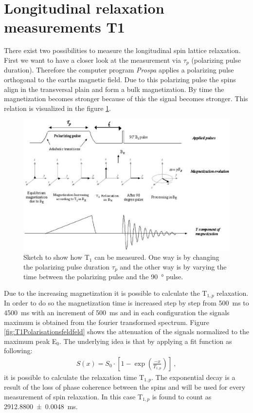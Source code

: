 \section{Longitudinal relaxation measurements T1}
\label{sec:LongitudinalrelaxationmeasurementsT1}
There exist two possibilities to measure the longitudinal spin lattice relaxation.
First we want to have a closer look at the measurement via $\tau_p$ (polarizing pulse duration).
Therefore the computer program \textit{Prospa} applies a polarizing pulse orthogonal to the earths magnetic field.
Due to this polarizing pulse the spins align in the transversal plain and form a bulk magnetization.
By time the magnetization becomes stronger because of this the signal becomes stronger.
This relation is visualized in the figure \ref{fig:BildT1}.

\begin{figure}[H]
    \centering
    \includegraphics[width= \textwidth]{Abbildungen/BildT1.png}   
    \caption[Sketch to show how T$_1$ can be measured. \cite{Bild}]{Sketch to show how T$_1$ can be measured.
    One way is by changing the polarizing pulse duration $\tau_p$ and the other way is by varying the time between the polarizing pulse and the \SI{90}{\degree} pulse. \cite{Bild}}
    \label{fig:BildT1}
\end{figure}

Due to the increasing magnetization it is possible to calculate the T$_{1,p}$ relaxation.
In order to do so the magnetization time is increased step by step from \SI{500}{\milli \second} to \SI{4500}{\milli \second} with an increment of \SI{500}{\milli \second} and in each configuration the signals maximum is obtained from the fourier transformed spectrum.
Figure \ref{fig:T1Polarisationsfeldfeld} shows the attenuation of the signals normalized to the maximum peak E$_0$.
The underlying idea is that by applying a fit function as following:
\begin{align}
    S(x)=S_0 \cdot \left[1-\exp\left(\frac{-x}{T_{1,p}}\right)\right] \ ,
    \label{eq: fitBp}
\end{align}
it is possible to calculate the relaxation time T$_{1,p}$.
The exponential decay is a result of the loss of phase coherence between the spins and will be used for every measurement of spin relaxation.
In this case T$_{1,p}$ is found to count as \SI{2912.8800 \pm 0.0048}{\milli \second}.

